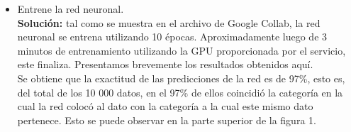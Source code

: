 \documentclass[letterpaper]{article}
\newcommand{\1}{\mathds{1}}
\theoremstyle{definition}
\theoremstyle{definition}
\theoremstyle{definition}
\theoremstyle{definition}
\theoremstyle{definition}
\begin{document}
\begin{itemize}
\begin{itemize}
        \item Entrene la red neuronal.\\
        
        \textbf{Solución:} tal como se muestra en el archivo de Google Collab, la red neuronal se entrena utilizando 
        10 épocas. Aproximadamente luego de 3 minutos de entrenamiento utilizando la GPU proporcionada por 
        el servicio, este finaliza. Presentamos brevemente los resultados obtenidos aquí.\\

        Se obtiene que la exactitud de las predicciones de la red es de 97\%, esto es, del total de los 10 000 datos, en el 97\% de ellos coincidió la categoría en 
        la cual la red colocó al dato con la categoría a la cual este mismo dato pertenece. Esto se puede observar en la parte superior de la figura 1.\\
        

\end{itemize}
\end{itemize}
\end{document}
